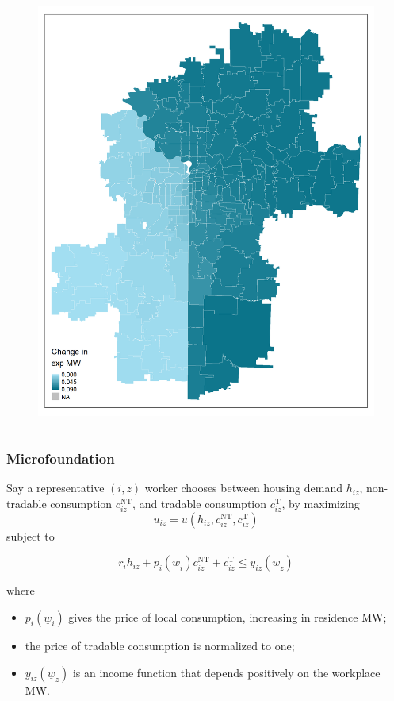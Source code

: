 \documentclass[aspectratio=169, t]{beamer}
\newcommand{\MW}{\underline{w}}
\begin{document}
\begin{frame}[label = kc_example]
\begin{columns}
\begin{column}{0.50\textwidth}
\begin{figure}
                \includegraphics[scale = 0.36]{maps_events/output/kc2018-12_exp_mw.png}
            \end{figure}   
        \end{column}
    \end{columns}
     \hyperlink{chi_example}{}
\end{frame}

\begin{frame}[label = microfound]
	\frametitle{Microfoundation}
	Say a representative $(i,z)$ worker chooses between housing demand $h_{iz}$,
	non-tradable consumption $c^{\text{NT}}_{iz}$, and tradable consumption $c^{\text{T}}_{iz}$,
	by maximizing
	\[
	u_{iz} = u \left(h_{iz}, c^{\text{NT}}_{iz}, c^{\text{T}}_{iz}\right)
	\]
	subject to

	\[
	r_i h_{iz} + p_i(\MW_i) c^{\text{NT}}_{iz} + c^{\text{T}}_{iz} \leq y_{iz}(\MW_z)
	\]

	where 
	\begin{itemize}
		\item $p_i(\MW_i)$ gives the price of local consumption, increasing in residence MW;
		\item the price of tradable consumption is normalized to one;  
		\item $y_{iz}(\MW_z)$ is an income function that depends positively on the workplace MW.
	\end{itemize}
\end{frame}
\end{document}
